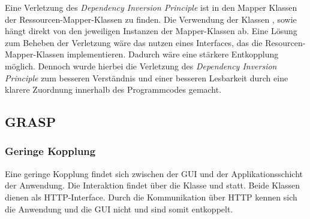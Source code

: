 Eine Verletzung des \textit{Dependency Inversion Principle} ist in den Mapper Klassen der Ressourcen-Mapper-Klassen zu finden. Die Verwendung der Klassen \href{https://github.com/lucasmerkel/dhbw-advancedswe-programmentwurf/blob/5764d7da4cfd0562ed8e96128e92f85c30b7309d/swe_programmentwurf/consumergoods-inventory-planner/1-cip-adapters/src/main/java/de/dhbw/cip/adapters/ConsumerGoodsToConsumerGoodsResourceMapper.java}{}, \href{https://github.com/lucasmerkel/dhbw-advancedswe-programmentwurf/blob/5764d7da4cfd0562ed8e96128e92f85c30b7309d/swe_programmentwurf/consumergoods-inventory-planner/1-cip-adapters/src/main/java/de/dhbw/cip/adapters/FridgeToFridgeResourceMapper.java}{} sowie \href{https://github.com/lucasmerkel/dhbw-advancedswe-programmentwurf/blob/5764d7da4cfd0562ed8e96128e92f85c30b7309d/swe_programmentwurf/consumergoods-inventory-planner/1-cip-adapters/src/main/java/de/dhbw/cip/adapters/FoodShelfToFoodShelfRessourceMapper.java}{} hängt direkt von den jeweiligen Instanzen der Mapper-Klassen ab.
Eine Lösung zum Beheben der Verletzung wäre das nutzen eines Interfaces, das die Resourcen-Mapper-Klassen implementieren.
Dadurch wäre eine stärkere Entkopplung möglich.
Dennoch wurde hierbei die Verletzung des \textit{Dependency Inversion Principle} zum besseren Verständnis und einer besseren Lesbarkeit durch eine klarere Zuordnung innerhalb des Programmcodes gemacht.

\subsection{\ac{GRASP}}

\subsubsection*{Geringe Kopplung}
Eine geringe Kopplung findet sich zwischen der \ac{GUI} und der Applikationsschicht der Anwendung.
Die Interaktion findet über die Klasse \href{https://github.com/lucasmerkel/dhbw-advancedswe-programmentwurf/blob/5764d7da4cfd0562ed8e96128e92f85c30b7309d/swe_programmentwurf/consumergoods-inventory-planner/0-cip-plugins/src/main/java/de/dhbw/cip/plugins/rest/ConsumerGoodsGuiController.java}{} und \href{https://github.com/lucasmerkel/dhbw-advancedswe-programmentwurf/blob/5764d7da4cfd0562ed8e96128e92f85c30b7309d/swe_programmentwurf/consumergoods-inventory-planner/0-cip-plugins/src/main/java/de/dhbw/cip/plugins/rest/StorageGuiController.java}{} statt.
Beide Klassen dienen als \ac{HTTP}-Interface.
Durch die Kommunikation über \ac{HTTP} kennen sich die Anwendung und die \ac{GUI} nicht und sind somit entkoppelt.

